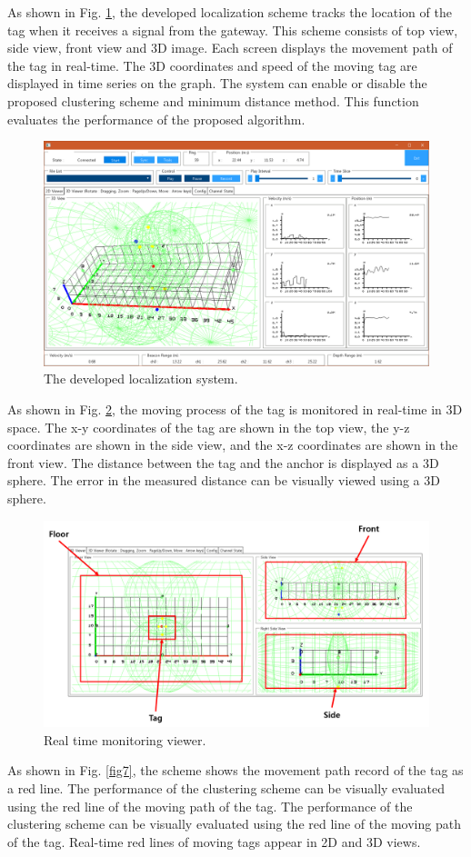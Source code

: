 \documentclass[conference]{IEEEtran}
\begin{document}
As shown in Fig. \ref{fig5}, the developed localization scheme tracks the location of the tag when it receives a signal from the gateway. This scheme consists of top view, side view, front view and 3D image. Each screen displays the movement path of the tag in real-time. The 3D coordinates and speed of the moving tag are displayed in time series on the graph. The system can enable or disable the proposed clustering scheme and minimum distance method. This function evaluates the performance of the proposed algorithm.

\begin{figure}[htbp]
    \centerline{\includegraphics[width=0.62\columnwidth]{fig5.png}}
    \caption{The developed localization system.}
    \label{fig5}
\end{figure}

As shown in Fig. \ref{fig6}, the moving process of the tag is monitored in real-time in 3D space. The x-y coordinates of the tag are shown in the top view, the y-z coordinates are shown in the side view, and the x-z coordinates are shown in the front view. The distance between the tag and the anchor is displayed as a 3D sphere. The error in the measured distance can be visually viewed using a 3D sphere.

\begin{figure}[htbp]
    \centerline{\includegraphics[width=0.62\columnwidth]{fig6.png}}
    \caption{Real time monitoring viewer.}
    \label{fig6}
\end{figure}

As shown in Fig. \ref{fig7}, the scheme shows the movement path record of the tag as a red line. The performance of the clustering scheme can be visually evaluated using the red line of the moving path of the tag. The performance of the clustering scheme can be visually evaluated using the red line of the moving path of the tag. Real-time red lines of moving tags appear in 2D and 3D views.
\end{document}
